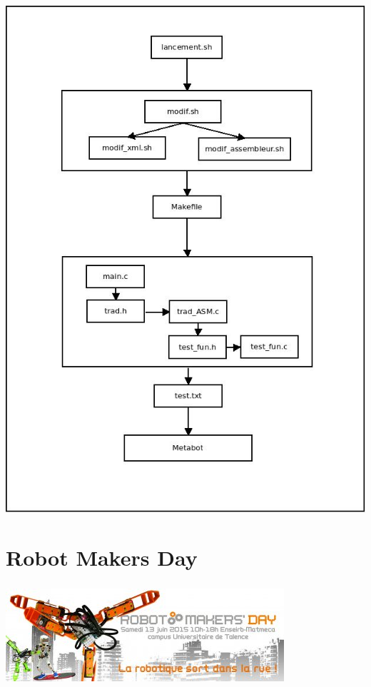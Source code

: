 \documentclass[10pt,a4paper]{report}
\begin{document}
\begin{center}
\includegraphics[scale=0.5]{image/schema.jpeg}
\end{center}


\paragraph{}
\chapter{Robot Makers Day}
\paragraph{}
\begin{center}
\includegraphics[scale=0.8]{image/makers.jpg}
\end{center}
\end{document}
